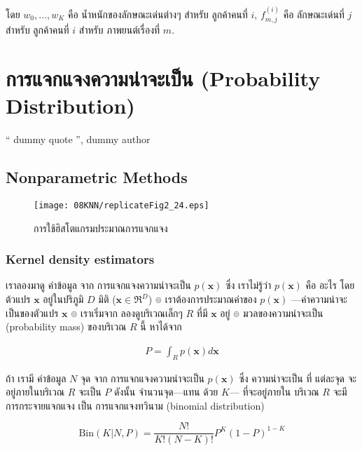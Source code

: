 โดย $w_0, \ldots, w_K$ คือ น้ำหนักของลักษณะเด่นต่างๆ สำหรับ ลูกค้าคนที่ $i$,
$f_{m,j}^{(i)}$ คือ ลักษณะเด่นที่ $j$ สำหรับ ลูกค้าคนที่ $i$ สำหรับ ภาพยนต์เรื่องที่ $m$.

\pagebreak

\section{การแจกแจงความน่าจะเป็น (Probability Distribution)}

`` dummy quote '', dummy author

\subsection{Nonparametric Methods}

%
\begin{figure}
\begin{center}
\texttt{[image: 08KNN/replicateFig2\_24.eps]}
\end{center}
\caption{การใช้ฮิสโตแกรมประมาณการแจกแจง}
\label{fig: ch03 nonparam histogram}
\end{figure}

\subsubsection{Kernel density estimators}

เราลองมาดู ค่าข้อมูล จาก การแจกแจงความน่าจะเป็น $p(\mathbf{x})$ ซึ่ง เราไม่รู้ว่า $p(\mathbf{x})$ คือ อะไร
โดย ต้วแปร $\mathbf{x}$ อยู่ในปริภูมิ $D$ มิติ
($\mathbf{x} \in \Re^D$)
๏ เราต้องการประมาณค่าของ $p(\mathbf{x})$ ---ค่าความน่าจะเป็นของตัวแปร $\mathbf{x}$
๏ เราเริ่มจาก ลองดูบริเวณเล็กๆ $R$ ที่มี $\mathbf{x}$ อยู่
๏ มวลของความน่าจะเป็น (probability mass) ของบริเวณ $R$ นี้ หาได้จาก

\begin{eqnarray}
  P = \int_R p(\mathbf{x}) d\mathbf{x}
\label{eq: 03ProbDist prob mass}
\end{eqnarray}

ถ้า เรามี ค่าข้อมูล $N$ จุด จาก การแจกแจงความน่าจะเป็น $p(\mathbf{x})$ ซึ่ง ความน่าจะเป็น ที่ แต่ละจุด จะอยู่ภายในบริเวณ $R$ จะเป็น $P$
ดังนั้น จำนวนจุด---แทน ด้วย $K$--- ที่จะอยู่ภายใน บริเวณ $R$ จะมีการกระจายแจกแจง เป็น การแจกแจงทวินาม (binomial distribution)

\begin{equation}
\mathrm{Bin}( K | N, P) = \frac{N!}{K! (N-K)!} P^K (1 - P)^{1-K}
\label{eq: 03ProbDist bin prob}
\end{equation}

